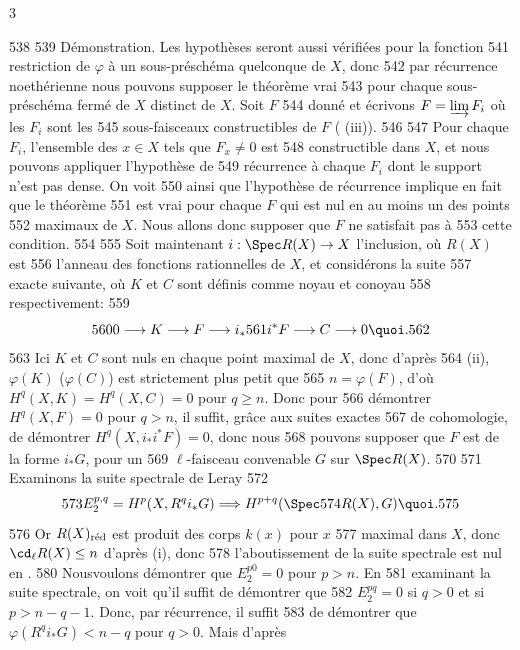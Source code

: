3	\documentclass[10pt]{../fichiers-configuration-latex/smfart}
\begin{document}
   538	
   539	Démonstration.	Les hypothèses seront aussi vérifiées pour la fonction
   541	restriction de $\varphi$\sisi{,}{} à un sous-préschéma quelconque de $X$, donc
   542	par récurrence noethérienne nous pouvons supposer le théorème vrai
   543	pour chaque sous-préschéma fermé de $X$ distinct de $X$. Soit $F$
   544	donné et écrivons $F=\varinjlim F_i$ où les $F_i$ sont les
   545	sous-faisceaux constructibles de $F$ ( (iii)).
   546	
   547	Pour chaque $F_i$, l'ensemble des $x\in X$ tels que $F_x\neq 0$ est
   548	constructible dans $X$, et nous pouvons appliquer l'hypothèse de
   549	récurrence à chaque $F_i$ dont le support n'est pas dense. On voit
   550	ainsi que l'hypothèse de récurrence implique en fait que le théorème
   551	est vrai pour chaque $F$ qui est nul en au moins un des points
   552	maximaux de $X$. Nous allons donc supposer que $F$ ne satisfait pas à
   553	cette condition.
   554	
   555	Soit maintenant $i:\Spec R(X)\rightarrow X$ l'inclusion, où $R(X)$ est
   556	l'anneau des fonctions rationnelles de $X$, et considérons la suite
   557	exacte suivante, où $K$ et $C$ sont définis comme noyau et conoyau
   558	respectivement:
   559	$$
   560	0\longrightarrow K\longrightarrow F\longrightarrow i_{\ast}
   561	i^{\ast}F\longrightarrow C\longrightarrow 0{\quoi}.
   562	$$
   563	Ici $K$ et $C$ sont nuls en chaque point maximal de $X$, donc d'après
   564	(ii), $\varphi(K)$ (\resp $\varphi(C)$) est strictement plus petit que
   565	$n=\varphi(F)$, d'où $H^q(X,K)=H^q(X,C)=0$ pour $q\geq n$. Donc\sisi{}{,} pour
   566	démontrer $H^q(X,F)=0$ pour $q>n$, il suffit, grâce aux suites exactes
   567	de cohomologie, de démontrer $H^q(X,i_{\ast}i^{\ast}F)=0$, donc nous
   568	pouvons supposer que $F$ est de la forme $i_{\ast}G$, pour un
   569	$\ell$-faisceau convenable $G$ sur $\Spec R(X)$.
   570	
   571	Examinons la suite spectrale de Leray
   572	$$
   573	E^{p,q}_2=H^p(X,R^qi_{\ast}G)\Longrightarrow H^{p+q}(\Spec
   574	R(X),G){\quoi}.
   575	$$
   576	Or $R(X)_{\text{\rm réd}}$ est produit des corps $k(x)$ pour $x$
   577	maximal dans $X$, donc $\cd_{\ell}R(X)\leq n$ d'après (i), donc
   578	l'aboutissement de la suite spectrale est nul en .
   580	Nous\pageoriginale voulons démontrer que $E^{p0}_2=0$ pour $p>n$. En
   581	examinant la suite spectrale, on voit qu'il suffit de démontrer que
   582	$E^{pq}_2=0$ si $q>0$ et si $p>n-q-1$. Donc, par récurrence, il suffit
   583	de démontrer que $\varphi(R^qi_{\ast}G)<n-q$ pour $q>0$. Mais d'après
\end{document}
